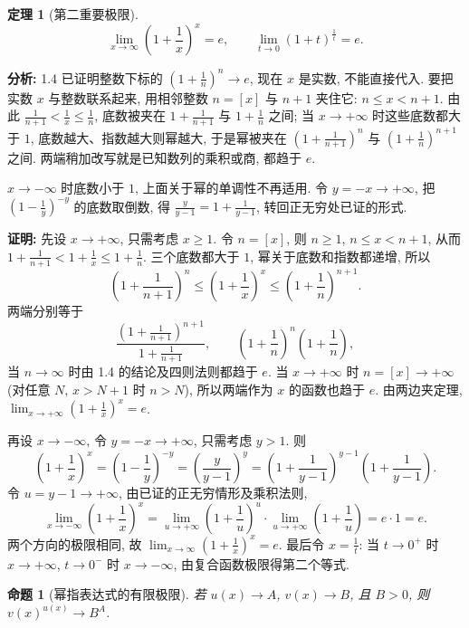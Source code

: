 \documentclass[UTF8,openany]{ctexbook}
\theoremstyle{chinesetextbook}
\newtheorem{theorem}{定理}[section]
\newenvironment{cnproof}{\par\indent\textbf{证明:} \ignorespaces}{\par}
\newtheorem*{propositionsingle}{命题}
\begin{document}
\begin{theorem}[第二重要极限]
\[
\lim_{x\to\infty}\left(1+\frac1x\right)^x=e,
\qquad
\lim_{t\to0}(1+t)^{\frac1t}=e.
\]
\end{theorem}
\par\indent\textbf{分析:} 1.4 已证明整数下标的 $\displaystyle\left(1+\frac1n\right)^n\to e$, 现在 $x$ 是实数, 不能直接代入. 要把实数 $x$ 与整数联系起来, 用相邻整数 $n=[x]$ 与 $n+1$ 夹住它: $n\le x<n+1$. 由此 $\displaystyle\frac1{n+1}<\frac1x\le\frac1n$, 底数被夹在 $\displaystyle1+\frac1{n+1}$ 与 $\displaystyle1+\frac1n$ 之间; 当 $x\to+\infty$ 时这些底数都大于 $1$, 底数越大、指数越大则幂越大, 于是幂被夹在 $\displaystyle\left(1+\frac1{n+1}\right)^n$ 与 $\displaystyle\left(1+\frac1n\right)^{n+1}$ 之间. 两端稍加改写就是已知数列的乘积或商, 都趋于 $e$.

$x\to-\infty$ 时底数小于 $1$, 上面关于幂的单调性不再适用. 令 $y=-x\to+\infty$, 把 $\displaystyle\left(1-\frac1y\right)^{-y}$ 的底数取倒数, 得 $\displaystyle\frac y{y-1}=1+\frac1{y-1}$, 转回正无穷处已证的形式.
\begin{cnproof}
先设 $x\to+\infty$, 只需考虑 $x\ge1$. 令 $n=[x]$, 则 $n\ge1$, $n\le x<n+1$, 从而 $\displaystyle1+\frac1{n+1}<1+\frac1x\le1+\frac1n$. 三个底数都大于 $1$, 幂关于底数和指数都递增, 所以
\[
\left(1+\frac1{n+1}\right)^n
\le\left(1+\frac1x\right)^x
\le\left(1+\frac1n\right)^{n+1}.
\]
两端分别等于
\[
\frac{\left(1+\frac1{n+1}\right)^{n+1}}{1+\frac1{n+1}},\qquad
\left(1+\frac1n\right)^n\left(1+\frac1n\right),
\]
当 $n\to\infty$ 时由 1.4 的结论及四则法则都趋于 $e$. 当 $x\to+\infty$ 时 $n=[x]\to+\infty$ (对任意 $N$, $x>N+1$ 时 $n>N$), 所以两端作为 $x$ 的函数也趋于 $e$. 由两边夹定理, $\displaystyle\lim_{x\to+\infty}\left(1+\frac1x\right)^x=e$.

再设 $x\to-\infty$, 令 $y=-x\to+\infty$, 只需考虑 $y>1$. 则
\[
\left(1+\frac1x\right)^x=\left(1-\frac1y\right)^{-y}
=\left(\frac{y}{y-1}\right)^{y}
=\left(1+\frac1{y-1}\right)^{y-1}\left(1+\frac1{y-1}\right).
\]
令 $u=y-1\to+\infty$, 由已证的正无穷情形及乘积法则,
\[
\lim_{x\to-\infty}\left(1+\frac1x\right)^x
=\lim_{u\to+\infty}\left(1+\frac1u\right)^u\cdot\lim_{u\to+\infty}\left(1+\frac1u\right)=e\cdot1=e.
\]
两个方向的极限相同, 故 $\displaystyle\lim_{x\to\infty}\left(1+\frac1x\right)^x=e$. 最后令 $\displaystyle x=\frac1t$: 当 $t\to0^+$ 时 $x\to+\infty$, $t\to0^-$ 时 $x\to-\infty$, 由复合函数极限得第二个等式.
\end{cnproof}
\begin{propositionsingle}[幂指表达式的有限极限]
若 $u(x)\to A$, $v(x)\to B$, 且 $B>0$, 则 $v(x)^{u(x)}\to B^A$.
\end{propositionsingle}
\end{document}
